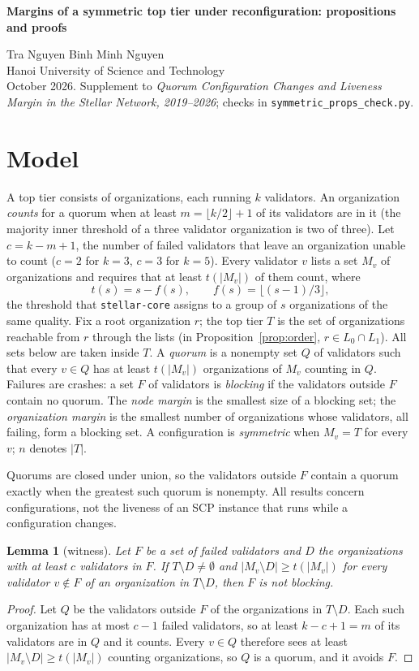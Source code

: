 \documentclass[11pt,a4paper]{article}
\newtheorem{lemma}{Lemma}
\begin{document}
{\Large\bfseries Margins of a symmetric top tier under reconfiguration: propositions and proofs}

Tra Nguyen \quad Binh Minh Nguyen\\
Hanoi University of Science and Technology\\
October 2026. Supplement to \emph{Quorum Configuration Changes and Liveness Margin in the Stellar Network, 2019--2026}; checks in \texttt{symmetric\_props\_check.py}.

\section*{Model}

A top tier consists of organizations, each running $k$ validators. An organization \emph{counts} for a quorum when at least $m=\lfloor k/2\rfloor+1$ of its validators are in it (the majority inner threshold of a three validator organization is two of three). Let $c=k-m+1$, the number of failed validators that leave an organization unable to count ($c=2$ for $k=3$, $c=3$ for $k=5$). Every validator $v$ lists a set $M_v$ of organizations and requires that at least $t(|M_v|)$ of them count, where
\[
t(s)=s-f(s),\qquad f(s)=\lfloor (s-1)/3\rfloor ,
\]
the threshold that \texttt{stellar-core} assigns to a group of $s$ organizations of the same quality. Fix a root organization $r$; the top tier $T$ is the set of organizations reachable from $r$ through the lists (in Proposition~\ref{prop:order}, $r\in L_0\cap L_1$). All sets below are taken inside $T$. A \emph{quorum} is a nonempty set $Q$ of validators such that every $v\in Q$ has at least $t(|M_v|)$ organizations of $M_v$ counting in $Q$. Failures are crashes: a set $F$ of validators is \emph{blocking} if the validators outside $F$ contain no quorum. The \emph{node margin} is the smallest size of a blocking set; the \emph{organization margin} is the smallest number of organizations whose validators, all failing, form a blocking set. A configuration is \emph{symmetric} when $M_v=T$ for every $v$; $n$ denotes $|T|$.

Quorums are closed under union, so the validators outside $F$ contain a quorum exactly when the greatest such quorum is nonempty. All results concern configurations, not the liveness of an SCP instance that runs while a configuration changes.

\begin{lemma}[witness]\label{lem:witness}
Let $F$ be a set of failed validators and $D$ the organizations with at least $c$ validators in $F$. If $T\setminus D\neq\emptyset$ and $|M_v\setminus D|\ge t(|M_v|)$ for every validator $v\notin F$ of an organization in $T\setminus D$, then $F$ is not blocking.
\end{lemma}
\begin{proof}
Let $Q$ be the validators outside $F$ of the organizations in $T\setminus D$. Each such organization has at most $c-1$ failed validators, so at least $k-c+1=m$ of its validators are in $Q$ and it counts. Every $v\in Q$ therefore sees at least $|M_v\setminus D|\ge t(|M_v|)$ counting organizations, so $Q$ is a quorum, and it avoids $F$.
\end{proof}
\end{document}
